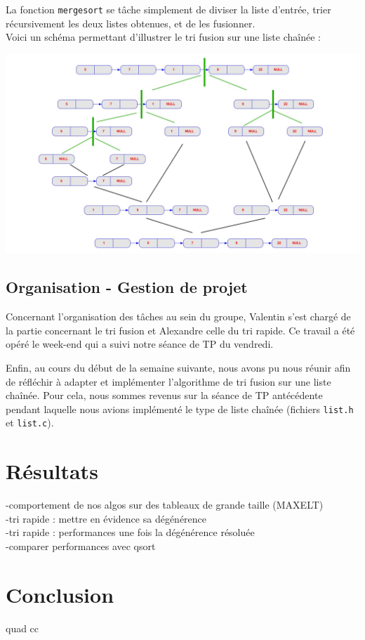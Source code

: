 \documentclass[11pt]{article}
\begin{document}
La fonction \texttt{merge\textunderscore sort} se tâche simplement de diviser la liste d'entrée, trier récursivement les deux listes obtenues, et de les fusionner. \\

Voici un schéma permettant d'illustrer le tri fusion sur une liste chaînée :

\begin{center}
\includegraphics[scale=0.25]{images/1.jpg}
\end{center}

\subsection{Organisation - Gestion de projet}

Concernant l'organisation des tâches au sein du groupe, Valentin s'est chargé de la partie concernant le tri fusion et Alexandre celle du tri rapide. Ce travail a été opéré le week-end qui a suivi notre séance de TP du vendredi.

Enfin, au cours du début de la semaine suivante, nous avons pu nous réunir afin de réfléchir à adapter et implémenter l'algorithme de tri fusion sur une liste chaînée. Pour cela, nous sommes revenus sur la séance de TP antécédente pendant laquelle nous avions implémenté le type de liste chaînée (fichiers \texttt{list.h} et \texttt{list.c}).


\section{Résultats}
-comportement de nos algos sur des tableaux de grande taille (MAX\textunderscore ELT) \\
-tri rapide : mettre en évidence sa dégénérence \\
-tri rapide : performances une fois la dégénérence résoluée \\
-comparer performances avec qsort 

\section{Conclusion}

\quad quad cc
\end{document}
